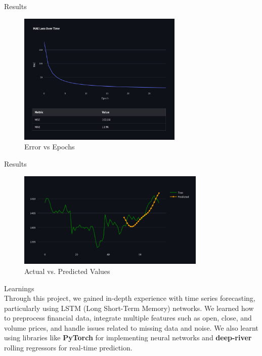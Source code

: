 \documentclass[9pt]{beamer}
\begin{document}
\begin{frame}{Results}
    \\[0.3cm]
    \begin{figure}[htbp]
        \centering
        \includegraphics[width=0.7\textwidth]{error.png}
        \caption{Error vs Epochs}
    \end{figure}
\end{frame}


\begin{frame}{Results}
    \\[0.3cm]
    \begin{figure}[htbp]
        \centering
        \includegraphics[width=0.8\textwidth]{predict.png}
        \caption{Actual vs. Predicted Values}
    \end{figure}
\end{frame}


\begin{frame}{Learnings}
    \\[0.3cm]
    Through this project, we gained in-depth experience with time series
    forecasting, particularly using LSTM (Long Short-Term Memory) networks. We
    learned how to preprocess financial data, integrate multiple features such as
    open, close, and volume prices, and handle issues related to missing data and
    noise. We also learnt using libraries like \textbf{PyTorch} for implementing
    neural networks and \textbf{deep-river} rolling regressors for real-time
    prediction.
\end{frame}
\end{document}
